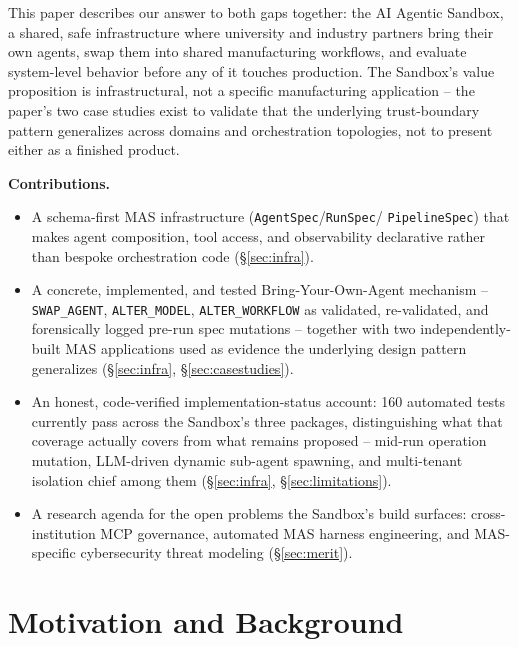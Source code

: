 \documentclass[10pt,conference]{IEEEtran}
\begin{document}
This paper describes our answer to both gaps together: the AI Agentic
Sandbox, a shared, safe infrastructure where university and industry
partners bring their own agents, swap them into shared manufacturing
workflows, and evaluate system-level behavior before any of it touches
production. The Sandbox's value proposition is infrastructural, not a
specific manufacturing application -- the paper's two case studies exist to
validate that the underlying trust-boundary pattern generalizes across
domains and orchestration topologies, not to present either as a finished
product.

\textbf{Contributions.}
\begin{itemize}
  \item A schema-first MAS infrastructure (\texttt{AgentSpec}/\texttt{RunSpec}/
  \texttt{PipelineSpec}) that makes agent composition, tool access, and
  observability declarative rather than bespoke orchestration code
  (\S\ref{sec:infra}).
  \item A concrete, implemented, and tested Bring-Your-Own-Agent mechanism --
  \texttt{SWAP\_AGENT}, \texttt{ALTER\_MODEL}, \texttt{ALTER\_WORKFLOW} as
  validated, re-validated, and forensically logged pre-run spec mutations --
  together with two independently-built MAS applications used as evidence
  the underlying design pattern generalizes (\S\ref{sec:infra},
  \S\ref{sec:casestudies}).
  \item An honest, code-verified implementation-status account: 160
  automated tests currently pass across the Sandbox's three packages,
  distinguishing what that coverage actually covers from what remains
  proposed -- mid-run operation mutation, LLM-driven dynamic sub-agent
  spawning, and multi-tenant isolation chief among them
  (\S\ref{sec:infra}, \S\ref{sec:limitations}).
  \item A research agenda for the open problems the Sandbox's build
  surfaces: cross-institution MCP governance, automated MAS harness
  engineering, and MAS-specific cybersecurity threat modeling
  (\S\ref{sec:merit}).
\end{itemize}

\section{Motivation and Background}
\label{sec:motivation}
\end{document}
